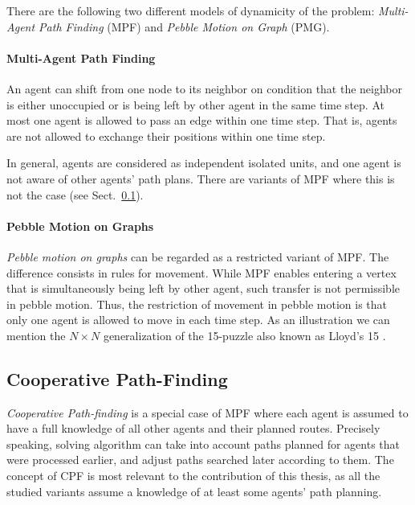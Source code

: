 There are the following two different models of dynamicity of the problem: \emph{Multi-Agent Path Finding} (MPF) and \emph{Pebble Motion on Graph} (PMG).

\paragraph{Multi-Agent Path Finding}
An agent can shift from one node to its neighbor on condition that the neighbor is either unoccupied or is being left by other agent in the same time step. 
At most one agent is allowed to pass an edge within one time step. 
That is, agents are not allowed to exchange their positions within one time step.

In general, agents are considered as independent isolated units, and one agent is not aware of other agents' path plans.
There are variants of MPF where this is not the case (see Sect.~\ref{sec:cpf}).


\paragraph{Pebble Motion on Graphs}

\emph{Pebble motion on graphs} \cite{source1,source2} can be regarded as a restricted variant of MPF. 
The difference consists in rules for movement. 
While MPF enables entering a vertex that is simultaneously being left by other agent, such transfer is not permissible in pebble motion. 
Thus, the restriction of movement in pebble motion is that only one agent is allowed to move in each time step.
As an illustration we can mention the $N\times N$ generalization of the 15-puzzle also known as Lloyd’s 15 \cite{ratner86}.

\subsection{Cooperative Path-Finding}\label{sec:cpf}

\emph{Cooperative Path-finding} \cite{silver05} is a special case of MPF where each agent is assumed to have a full knowledge of all other agents and their planned routes.
Precisely speaking, solving algorithm can take into account paths planned for agents that were processed earlier, and adjust paths searched later according to them.
The concept of CPF is most relevant to the contribution of this thesis, as all the studied variants assume a knowledge of at least some agents' path planning.

